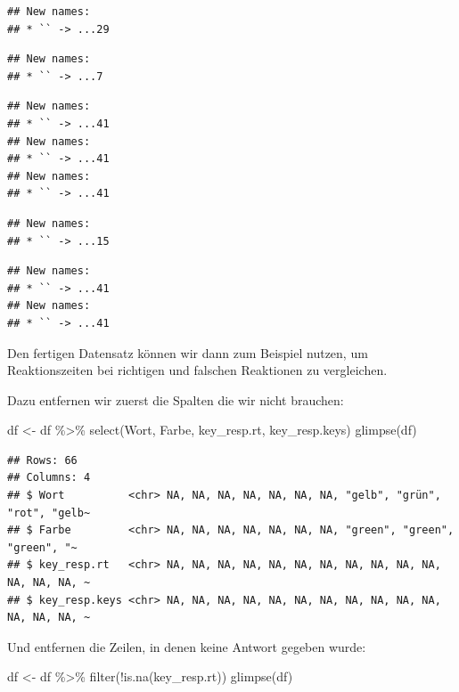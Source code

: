 \documentclass[
]{book}
\newenvironment{Shaded}{\begin{snugshade}}{\end{snugshade}}
\newcommand{\FunctionTok}[1]{\textcolor[rgb]{0.00,0.00,0.00}{#1}}
\newcommand{\NormalTok}[1]{#1}
\newcommand{\OtherTok}[1]{\textcolor[rgb]{0.56,0.35,0.01}{#1}}
\newcommand{\SpecialCharTok}[1]{\textcolor[rgb]{0.00,0.00,0.00}{#1}}
\begin{document}
\begin{verbatim}
## New names:
## * `` -> ...29
\end{verbatim}

\begin{verbatim}
## New names:
## * `` -> ...7
\end{verbatim}

\begin{verbatim}
## New names:
## * `` -> ...41
## New names:
## * `` -> ...41
## New names:
## * `` -> ...41
\end{verbatim}

\begin{verbatim}
## New names:
## * `` -> ...15
\end{verbatim}

\begin{verbatim}
## New names:
## * `` -> ...41
## New names:
## * `` -> ...41
\end{verbatim}

Den fertigen Datensatz können wir dann zum Beispiel nutzen, um Reaktionszeiten bei richtigen und falschen Reaktionen zu vergleichen.

Dazu entfernen wir zuerst die Spalten die wir nicht brauchen:

\begin{Shaded}
\begin{Highlighting}[]
\NormalTok{df }\OtherTok{\textless{}{-}}\NormalTok{ df }\SpecialCharTok{\%\textgreater{}\%} 
  \FunctionTok{select}\NormalTok{(Wort, Farbe, key\_resp.rt, key\_resp.keys)}
\FunctionTok{glimpse}\NormalTok{(df)}
\end{Highlighting}
\end{Shaded}

\begin{verbatim}
## Rows: 66
## Columns: 4
## $ Wort          <chr> NA, NA, NA, NA, NA, NA, NA, "gelb", "grün", "rot", "gelb~
## $ Farbe         <chr> NA, NA, NA, NA, NA, NA, NA, "green", "green", "green", "~
## $ key_resp.rt   <chr> NA, NA, NA, NA, NA, NA, NA, NA, NA, NA, NA, NA, NA, NA, ~
## $ key_resp.keys <chr> NA, NA, NA, NA, NA, NA, NA, NA, NA, NA, NA, NA, NA, NA, ~
\end{verbatim}

Und entfernen die Zeilen, in denen keine Antwort gegeben wurde:

\begin{Shaded}
\begin{Highlighting}[]
\NormalTok{df }\OtherTok{\textless{}{-}}\NormalTok{ df }\SpecialCharTok{\%\textgreater{}\%} 
  \FunctionTok{filter}\NormalTok{(}\SpecialCharTok{!}\FunctionTok{is.na}\NormalTok{(key\_resp.rt))}
\FunctionTok{glimpse}\NormalTok{(df)}
\end{Highlighting}
\end{Shaded}
\end{document}

